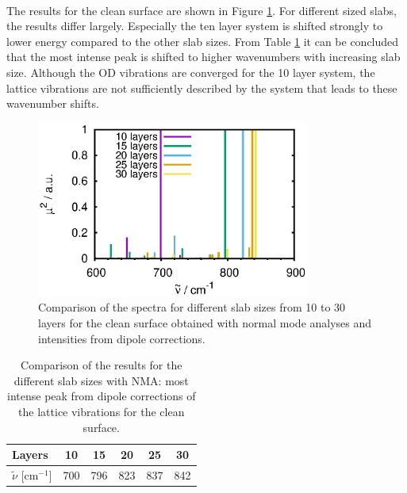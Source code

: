 \documentclass[11pt,DIV=13,BCOR=5mm,a4paper,headinclude]{scrbook}
\begin{document}
\\
The results for the clean surface are shown in Figure \ref{abb:clean_comp_layer}.
For different sized slabs, the results differ largely.
Especially the ten layer system is shifted strongly to lower energy compared to the other slab sizes.
From Table \ref{tab:comp_norm-modes_clean} it can be concluded that the most intense peak is shifted to higher wavenumbers with increasing slab size.
Although the OD vibrations are converged for the 10 layer system, the lattice vibrations are not sufficiently described by the system that leads to these wavenumber shifts.
\begin{figure}[!h]
 \centering
 \includegraphics[width=0.8\textwidth]{figures/11-20/comp_freq_surf.eps}
 \caption{Comparison of the spectra for different slab sizes from 10 to 30 layers for the clean surface obtained with normal mode analyses and intensities from dipole corrections.}
 \label{abb:clean_comp_layer}
\end{figure}
\begin{table}[!h]
  \centering
 \caption{Comparison of the results for the different slab sizes with NMA: most intense peak from dipole corrections of the lattice vibrations for the clean surface.}
\vspace*{.2cm} 
  \begin{tabular}{l|ccccc}
  \toprule
Layers& 10&15&20&25&30 \\\midrule
$\tilde{\nu}$ [cm$^{-1}$] &700 &796& 823&837 & 842\\\bottomrule
  \end{tabular}
  \label{tab:comp_norm-modes_clean}
\end{table}
\\
\end{document}
